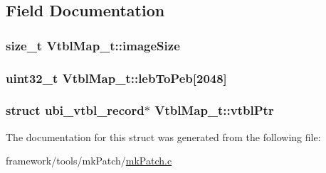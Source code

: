 \subsection{Field Documentation}
\subsubsection[{\texorpdfstring{image\+Size}{imageSize}}]{\setlength{\rightskip}{0pt plus 5cm}size\+\_\+t Vtbl\+Map\+\_\+t\+::image\+Size}\hypertarget{struct_vtbl_map__t_a36742bd234cebd53fab88b9926050a4e}{}\label{struct_vtbl_map__t_a36742bd234cebd53fab88b9926050a4e}
\subsubsection[{\texorpdfstring{leb\+To\+Peb}{lebToPeb}}]{\setlength{\rightskip}{0pt plus 5cm}uint32\+\_\+t Vtbl\+Map\+\_\+t\+::leb\+To\+Peb\mbox{[}2048\mbox{]}}\hypertarget{struct_vtbl_map__t_ae4762690bee41ef7d7fdd0f6afda3eff}{}\label{struct_vtbl_map__t_ae4762690bee41ef7d7fdd0f6afda3eff}
\subsubsection[{\texorpdfstring{vtbl\+Ptr}{vtblPtr}}]{\setlength{\rightskip}{0pt plus 5cm}struct ubi\+\_\+vtbl\+\_\+record$\ast$ Vtbl\+Map\+\_\+t\+::vtbl\+Ptr}\hypertarget{struct_vtbl_map__t_a3d1fa6b61320dc19dc33ea96fd0846dd}{}\label{struct_vtbl_map__t_a3d1fa6b61320dc19dc33ea96fd0846dd}


The documentation for this struct was generated from the following file\+:\begin{DoxyCompactItemize}
\item 
framework/tools/mk\+Patch/\hyperlink{mk_patch_8c}{mk\+Patch.\+c}\end{DoxyCompactItemize}
